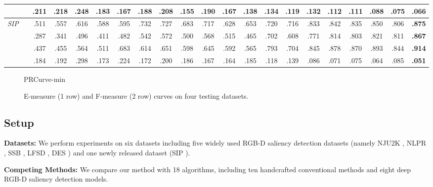 \documentclass[10pt,twocolumn,letterpaper]{article}
\begin{document}
\begin{table*}[t!]
\begin{tabular}{rr|cccccccccc|cccccccc|c}
    &  & .211 & .218 & .248 & .183 & .167 & .188 & .208 & .155 & .190 & .167 & .138 & .134 & .119 & .132 & .112 & .111 & .088 & .075 & \textbf{.066}\\ \hline
\multirow{4}{*}{\textit{SIP} \cite{sip_dataset}}
    &     & .511 & .557 & .616 & .588 & .595 & .732 & .727 & .683 & .717 & .628 & .653 & .720 & .716 & .833 & .842 & .835 & .850 & .806 & \textbf{.875}\\
    &      & .287 & .341 & .496 & .411 & .482 & .542 & .572 & .500 & .568 & .515 & .465 & .702 & .608 & .771 & .814 & .803 & .821 & .811 & \textbf{.867}\\
    &        & .437 & .455 & .564 & .511 & .683 & .614 & .651 & .598 & .645 & .592 & .565 & .793 & .704 & .845 & .878 & .870 & .893 & .844 & \textbf{.914}\\
    &  & .184 & .192 & .298 & .173 & .224 & .172 & .200 & .186 & .167 & .164 & .185 & .118 & .139 & .086 & .071 & .075 & .064 & .085 & \textbf{.051}\\
\hline
  \end{tabular}
\end{table*}



  




\begin{figure*}[thp!]
	\centering
    \small
	\begin{overpic}[width=\textwidth]{PRCurve-min}
    \end{overpic}
     \caption{E-measure (1 row) and F-measure (2 row) curves on four testing datasets.} \label{fig:E_F_measure_show}
  \vspace{-4mm}
\end{figure*}



\subsection{Setup}
\noindent\textbf{Datasets:}
We perform experiments on six datasets including five widely used RGB-D saliency detection datasets (namely NJU2K \cite{NJU2000}, NLPR \cite{peng2014rgbd}, SSB \cite{niu2012leveraging}, LFSD \cite{li2014saliency}, DES \cite{cheng2014depth}) and one newly released dataset (SIP \cite{sip_dataset}). 



         
\noindent\textbf{Competing Methods:}
We compare our method with 18 algorithms, including ten handcrafted conventional methods and eight deep RGB-D saliency detection models. 
\end{document}
